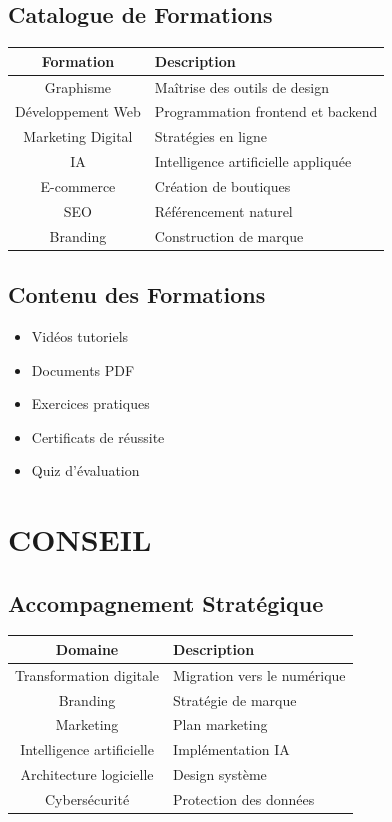 \documentclass[12pt,a4paper,oneside]{book}
\begin{document}
\section{Catalogue de Formations}
\begin{center}
\begin{tabular}{|c|p{10cm}|}
\hline
\rowcolor{electronblue}
\color{white}\textbf{Formation} & \color{white}\textbf{Description} \\
\hline
Graphisme & Maîtrise des outils de design \\
\hline
Développement Web & Programmation frontend et backend \\
\hline
Marketing Digital & Stratégies en ligne \\
\hline
IA & Intelligence artificielle appliquée \\
\hline
E-commerce & Création de boutiques \\
\hline
SEO & Référencement naturel \\
\hline
Branding & Construction de marque \\
\hline
\end{tabular}
\end{center}

\section{Contenu des Formations}
\begin{itemize}
\item Vidéos tutoriels
\item Documents PDF
\item Exercices pratiques
\item Certificats de réussite
\item Quiz d'évaluation
\end{itemize}

\chapter{CONSEIL}

\section{Accompagnement Stratégique}
\begin{center}
\begin{tabular}{|c|p{10cm}|}
\hline
\rowcolor{electronpurple}
\color{white}\textbf{Domaine} & \color{white}\textbf{Description} \\
\hline
Transformation digitale & Migration vers le numérique \\
\hline
Branding & Stratégie de marque \\
\hline
Marketing & Plan marketing \\
\hline
Intelligence artificielle & Implémentation IA \\
\hline
Architecture logicielle & Design système \\
\hline
Cybersécurité & Protection des données \\
\hline
\end{tabular}
\end{center}
\end{document}
